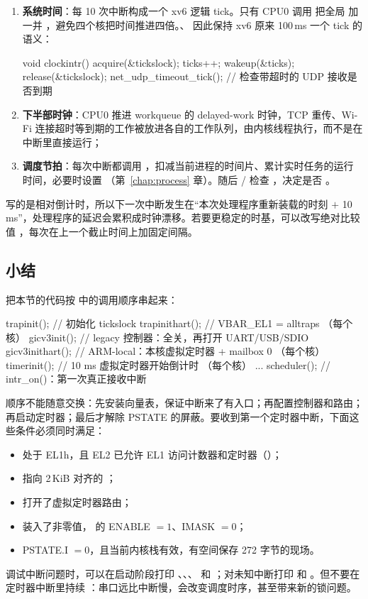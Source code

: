 \begin{enumerate}
  \item \textbf{系统时间}：每 10 次中断构成一个 xv6 逻辑 tick。只有 CPU0 调用  把全局  加一并 ，避免四个核把时间推进四倍。、 因此保持 xv6 原来 100\,ms 一个 tick 的语义：
\begin{ccode}
void clockintr()
{
  acquire(&tickslock);
  ticks++;
  wakeup(&ticks);
  release(&tickslock);
  net_udp_timeout_tick();       // 检查带超时的 UDP 接收是否到期
}
\end{ccode}
  \item \textbf{下半部时钟}：CPU0 推进 workqueue 的 delayed-work 时钟，TCP 重传、Wi-Fi 连接超时等到期的工作被放进各自的工作队列，由内核线程执行，而不是在中断里直接运行；
  \item \textbf{调度节拍}：每次中断都调用 ，扣减当前进程的时间片、累计实时任务的运行时间，必要时设置 （第~\ref{chap:process} 章）。随后 / 检查 ，决定是否 。
\end{enumerate}

 写的是相对倒计时，所以下一次中断发生在“本次处理程序重新装载的时刻 $+$ 10\,ms”，处理程序的延迟会累积成时钟漂移。若要更稳定的时基，可以改写绝对比较值 ，每次在上一个截止时间上加固定间隔。

\subsection{小结}

把本节的代码按  中的调用顺序串起来：

\begin{ccode}
trapinit();        // 初始化 tickslock
trapinithart();    // VBAR_EL1 = alltraps                   （每个核）
gicv3init();       // legacy 控制器：全关，再打开 UART/USB/SDIO
gicv3inithart();   // ARM-local：本核虚拟定时器 + mailbox 0  （每个核）
timerinit();       // 10 ms 虚拟定时器开始倒计时            （每个核）
...
scheduler();       // intr_on()：第一次真正接收中断
\end{ccode}

顺序不能随意交换：先安装向量表，保证中断来了有入口；再配置控制器和路由；再启动定时器；最后才解除 PSTATE 的屏蔽。要收到第一个定时器中断，下面这些条件必须同时满足：

\begin{itemize}
  \item 处于 EL1h，且 EL2 已允许 EL1 访问计数器和定时器（）；
  \item {} 指向 2\,KiB 对齐的 ；
  \item {} 打开了虚拟定时器路由；
  \item {} 装入了非零值， 的 ENABLE $=1$、IMASK $=0$；
  \item PSTATE.I $=0$，且当前内核栈有效，有空间保存 272 字节的现场。
\end{itemize}

调试中断问题时，可以在启动阶段打印 、、、 和 ；对未知中断打印  和 。但不要在定时器中断里持续 ：串口远比中断慢，会改变调度时序，甚至带来新的锁问题。
